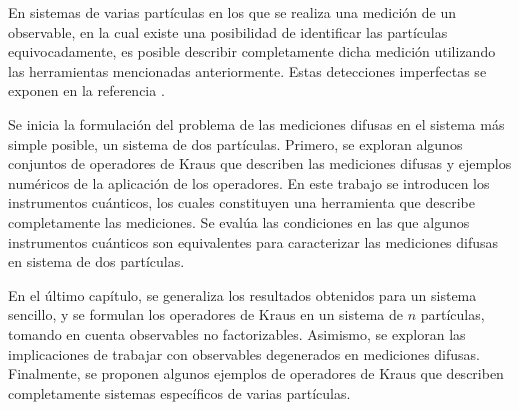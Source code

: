 \documentclass[12pt,oneside]{book}\raggedbottom{} %
\begin{document}
{{En sistemas de varias partículas en los que se realiza una medición de un
observable, en la cual existe una posibilidad de identificar las partículas
equivocadamente, es posible describir completamente dicha medición utilizando
las herramientas mencionadas anteriormente. Estas detecciones imperfectas se
exponen en la referencia {\cite{Pineda_2021}}. 

Se inicia la formulación del problema de las mediciones difusas en el sistema
más simple posible, un sistema de dos partículas. Primero, se exploran algunos
conjuntos de operadores de Kraus que describen las mediciones difusas y
ejemplos numéricos  de la aplicación de los
operadores. En este trabajo se
introducen los instrumentos cuánticos, los cuales constituyen una herramienta
que describe completamente las mediciones. Se evalúa las condiciones en las que
algunos instrumentos cuánticos son equivalentes para caracterizar las
mediciones difusas en sistema de dos partículas.

En el último capítulo, se generaliza los resultados obtenidos para un sistema
sencillo, y se formulan los operadores de Kraus en un sistema de $n$
partículas, tomando en cuenta observables no factorizables. Asimismo, se
exploran las implicaciones de trabajar con observables degenerados en
mediciones difusas. Finalmente, se proponen algunos ejemplos de operadores de
Kraus que describen completamente sistemas específicos de varias partículas. 

}}
\end{document}
